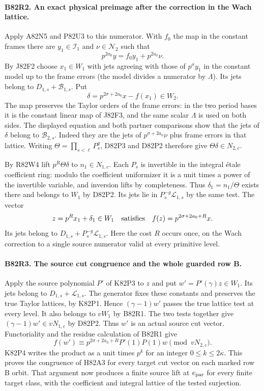 \paragraph{B82R2. An exact physical preimage after the correction in the Wach lattice.}
Apply A82N5 and P82U3 to this numerator. With $f_0$ the
map in the constant frames there are $y_1\in\mathcal I_1$
and $\nu\in\mathcal N_2$ such that
\[
        p^{2a_0}y=f_0y_1+p^{2a_0}\nu .
\]
By J82F2 choose $x_1\in W_1$ with jets agreeing with those
of $p^\sigma y_1$ in the constant model up to the frame errors
(the model divides a numerator by $\Lambda$). Its jets belong
to $D_{1,s}+\mathcal B_{1,s}$. Put
\[
             \delta=p^{2\sigma+2a_0}x-f(x_1)\in W_2 .
\]
The map preserves the Taylor orders of the frame errors: in
the two period bases it is the constant linear map of J82F3,
and the same scalar $\Lambda$ is used on both sides. The
displayed equation and both partner comparisons show that the
jets of $\delta$ belong to $\mathcal B_{2,s}$. Indeed they are
the jets of $p^{\sigma+2a_0}\nu$ plus frame errors in that
lattice. Writing $\Theta=\prod_{s<\ell}P_s^g$, D82P3 and
D82P2 therefore give $\Theta\delta\in N_{2,c}$.

By R82W4 lift $p^R\Theta\delta$ to $n_1\in N_{1,c}$.
Each $P_s$ is invertible in the integral \'etale coefficient
ring: modulo the coefficient uniformizer it is a unit times
a power of the invertible variable, and inversion lifts by
completeness. Thus $\delta_1=n_1/\Theta$ exists there and
belongs to $W_1$ by D82P2. Its jets lie in
$P_s^{-g}\mathcal L_{1,s}$ by the same test. The vector
\[
          z=p^R x_1+\delta_1\in W_1
       \quad\hbox{satisfies}\quad
          f(z)=p^{2\sigma+2a_0+R}x .
\]
Its jets belong to $D_{1,s}+P_s^{-g}\mathcal L_{1,s}$.
Here the cost $R$ occurs once, on the Wach correction to a
single source numerator valid at every primitive level.

\paragraph{B82R3. The source cut congruence and the whole guarded row B.}
Apply the source polynomial $P'$ of K82P3 to $z$ and put
$w'=P'(\gamma)z\in W_1$. Its jets belong to
$D_{1,s}+\mathcal L_{1,s}$. The generator fixes these
constants and preserves the true Taylor lattices, by K82P1.
Hence $(\gamma-1)w'$ passes the true lattice test at every
level. It also belongs to $vW_1$ by B82R1. The two tests
together give $(\gamma-1)w'\in vN_{1,c}$ by D82P2. Thus
$w'$ is an actual source cut vector. Functoriality and the
residue calculation of B82R1 give
\[
 f(w')\equiv
     p^{2\sigma+2a_0+R}P'(1)P(1)w\pmod{vN_{2,c}}.
\]
K82P4 writes the product as a unit times $p^k$ for an
integer $0\le k\le2\kappa$. This proves the congruence
of H82A3 for every target cut vector on each marked row B
orbit. That argument now produces a finite source lift at
$e_{\rm par}$ for every finite target class, with the
coefficient and integral lattice of the tested surjection.


